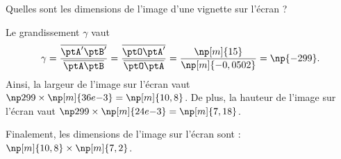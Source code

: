 


\begin{enonce}
Quelles sont les dimensions de l'image d'une vignette sur l'écran ?
\end{enonce}


\begin{corrige}
Le grandissement $\gamma$ vaut 
\[
\gamma =\frac{\overline{\ptA'\ptB'}}{\overline{\ptA\ptB}}=\frac{\overline{\ptO\ptA'}}{\overline{\ptO\ptA}}=\frac{\np[m]{15}}{\np[m]{-0,0502}}=\np{-299}.
\]
Ainsi, la largeur de l'image sur l'écran vaut  $\np299\times\np[m]{36e{-3}}=\np[m]{10,8}$. De plus, la hauteur de l'image sur l'écran vaut $\np299\times\np[m]{24e{-3}}=\np[m]{7,18}$. 

Finalement, les dimensions de l'image sur l'écran sont : $\np[m]{10,8}\times\np[m]{7,2}$.
\end{corrige}


\finEntrainement









\hauteurLargeurCadreReponse		{6mm}{1.5cm}
\initialisationEntrainement

\debutEntrainement

